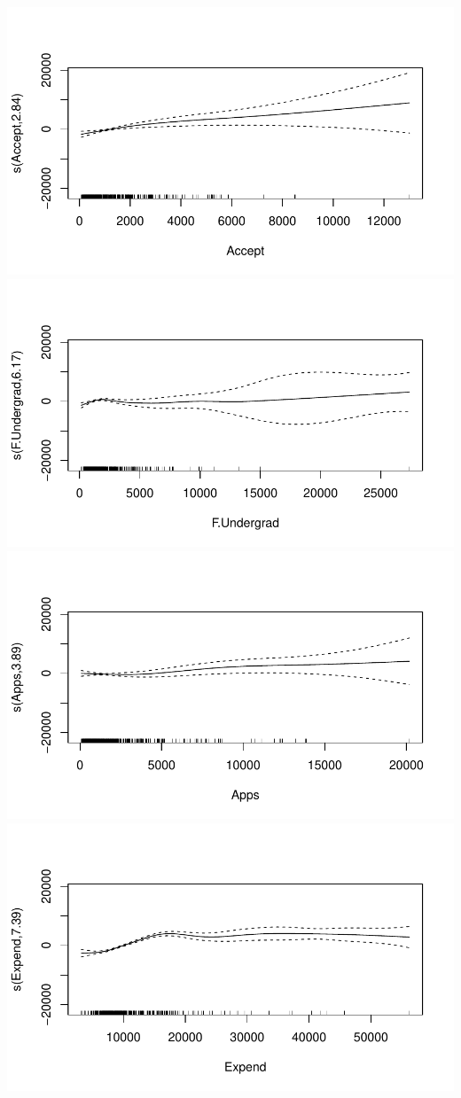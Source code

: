 \documentclass[
]{article}
\begin{document}
\includegraphics[width=0.9\linewidth]{HW2_co2554_files/figure-latex/GAM-13}
\includegraphics[width=0.9\linewidth]{HW2_co2554_files/figure-latex/GAM-14}
\includegraphics[width=0.9\linewidth]{HW2_co2554_files/figure-latex/GAM-15}
\includegraphics[width=0.9\linewidth]{HW2_co2554_files/figure-latex/GAM-16}
\end{document}
